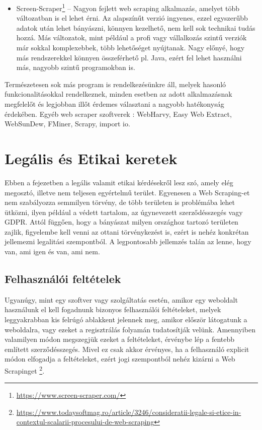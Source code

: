 \begin{itemize}
\item Screen-Scraper\footnote{\url{https://www.screen-scraper.com/}} – Nagyon fejlett web scraping alkalmazás, amelyet több változatban is el lehet érni. Az alapszínűt verzió ingyenes, ezzel egyszerűbb adatok után lehet bányászni, könnyen kezelhető, nem kell sok technikai tudás hozzá. Más változatok, mint például a profi vagy vállalkozás szintű verziók már sokkal komplexebbek, több lehetőséget nyújtanak. Nagy előnyé, hogy más rendszerekkel könnyen összeférhető pl. Java, ezért fel lehet használni más, nagyobb szintű programokban is.
\end{itemize}

Természetesen sok más program is rendelkezésünkre áll, melyek hasonló funkcionalitásokkal rendelkeznek, minden esetben az adott alkalmazásnak megfelelőt és legjobban illőt érdemes választani a nagyobb hatékonyság érdekében. Egyéb web scraper szoftverek \cite{sirisuriya2015comparative}: WebHarvy, Easy Web Extract, WebSunDew, FMiner, Scrapy, import io. 

\section{Legális és Etikai keretek}

Ebben a fejezetben a legális valamit etikai kérdésekről lesz szó, amely elég megosztó, illetve nem teljesen egyértelmű terület. Egyenesen a Web Scraping-et nem szabályozza semmilyen törvény, de több területen is problémába lehet ütközni, ilyen például a védett tartalom, az úgynevezett szerződésszegés vagy GDPR. Attól függően, hogy a bányászat milyen országhoz tartozó területen zajlik, figyelembe kell venni az ottani törvénykezést is, ezért is nehéz konkrétan jellemezni legalitási szempontból. A legpontosabb jellemzés talán az lenne, hogy van, ami igen és van, ami nem.

\subsection{Felhasználói feltételek}

Ugyanúgy, mint egy szoftver vagy szolgáltatás esetén, amikor egy weboldalt használunk el kell fogadnunk bizonyos felhasználói feltételeket, melyek leggyakrabban kis felrúgó ablakkent jelennek meg, amikor először látogatunk a weboldalra, vagy ezeket a regisztrálás folyamán tudatosítják velünk. Amennyiben valamilyen módon megszegjük ezeket a feltételeket, érvénybe lép a fentebb említett szerződésszegés. Mivel ez csak akkor érvényes, ha a felhasználó explicit módon elfogadja a feltételeket, ezért jogi szempontból nehéz kizárni a Web Scrapinget \footnote{\url{https://www.todaysoftmag.ro/article/3246/consideratii-legale-si-etice-in-contextul-scalarii-procesului-de-web-scraping}}. 

